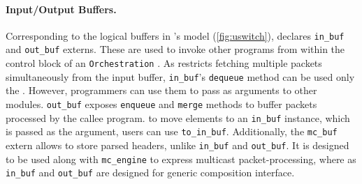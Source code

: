 \documentclass[letterpaper,twocolumn,10pt]{article}
\begin{document}
\paragraph{Input/Output Buffers.}
Corresponding to the logical buffers in \uswitch's model
(\cref{fig:uswitch}), \uarch declares \texttt{in\_buf} and
\texttt{out\_buf} externs. These are used to invoke other programs
from within the control block of an \texttt{Orchestration} \upipeline.
As \uswitch restricts fetching multiple packets simultaneously
from the input buffer, \texttt{in\_buf}'s \texttt{dequeue} method
can be used only  the \uswitch. However, programmers can use them to
pass as arguments to other modules. \texttt{out\_buf} exposes
\texttt{enqueue} and \texttt{merge} methods to buffer packets
processed by the callee program. to move elements to an
\texttt{in\_buf} instance, which is passed as the argument, users
can use \texttt{to\_in\_buf}. Additionally, the \texttt{mc\_buf}
extern allows to store parsed headers, unlike \texttt{in\_buf} and
\texttt{out\_buf}. It is designed to be used along with
\texttt{mc\_engine} to express multicast packet-processing, where as
\texttt{in\_buf} and \texttt{out\_buf} are designed for generic
composition interface.

\end{document}
